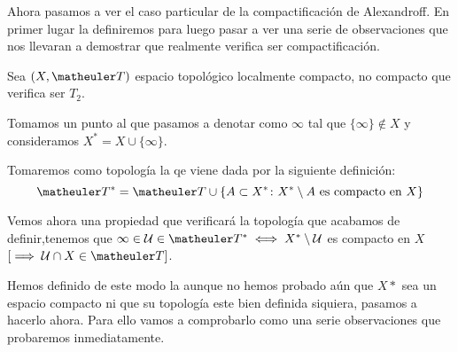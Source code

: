 Ahora pasamos a ver el caso particular de la compactificación de Alexandroff. En primer lugar la definiremos para luego pasar a ver una serie de observaciones que nos llevaran a demostrar que realmente verifica ser compactificación.
\begin{defi}
	Sea $(X,\T)$ espacio topológico localmente compacto, no compacto que verifica ser $T_2$.
	
	Tomamos un punto al que pasamos a denotar como $\infty$ tal que  $\{\infty\}\notin X$ y consideramos $X^*=X\cup\{\infty\}$. 
	
	Tomaremos como  topología la qe viene dada por la siguiente definición:
	\begin{equation}
		\T ^* = \T \cup \{A \subset X^* \colon X^*\setminus A \textup{ es compacto en }X\}
	\end{equation}
	
	Vemos ahora una propiedad que verificará la topología que acabamos de definir,tenemos que  $\infty\in\U\in\T^* \sii X^*\setminus\U$ es compacto en $X$ $[\ra \U\cap X\in\T]$.
\end{defi}
Hemos definido de este modo la  aunque no hemos probado aún que $X*$ sea un espacio compacto ni que su topología este bien definida siquiera, pasamos a hacerlo ahora. Para ello vamos a comprobarlo como una serie observaciones que probaremos inmediatamente.

